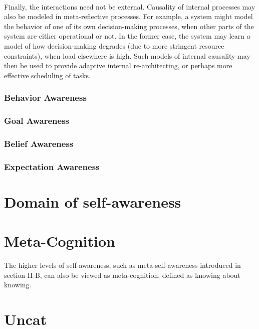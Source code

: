 \documentclass{article}
\begin{document}
					\paragraph{} Finally, the interactions need not be external. Causality of internal processes may
					also be modeled in meta-reflective processes. For example, a system might model
					the behavior of one of its own decision-making processes, when other parts of the
					system are either operational or not. In the former case, the system may learn a model
					of how decision-making degrades (due to more stringent resource constraints), when
					load elsewhere is high. Such models of internal causality may then be used to provide
					adaptive internal re-architecting, or perhaps more effective scheduling of tasks.
					
				\subsubsection{Behavior Awareness}
				\subsubsection{Goal Awareness}
				\subsubsection{Belief Awareness}
				\subsubsection{Expectation Awareness}
		\section{Domain of self-awareness} \cite{lewis-2017-towards-a-framework-for-the-levels-and-aspects-of-self-aware-computing-systems}
		
		\section{Meta-Cognition}
			The higher levels of self-awareness, such as meta-self-awareness introduced in section \citet{lewis-2011-a-survey-of-self-awareness-and-its-application-in-computing-systems}II-B, can also be viewed as
			meta-cognition, defined \citet{overschelde-2008-metacognition-knowing-about-knowing} as knowing about knowing.
		
		\section{Uncat}
\end{document}
